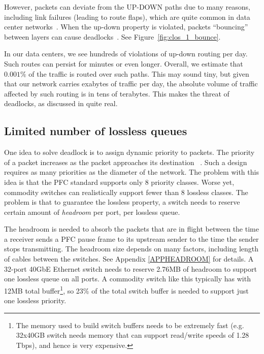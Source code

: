 However, packets can deviate from the UP-DOWN paths due to many reasons,
including link failures (leading to route flaps), which are quite common in data
center networks~\cite{netpilot,f10}. When the up-down property is violated,
packets ``bouncing'' between layers can cause
deadlocks~\cite{shpiner2016unlocking}. See
Figure~\ref{fig:clos_1_bounce}.

In our data centers, we see hundreds of violations of up-down routing per
day. Such routes can persist for minutes or even longer. Overall, we estimate
that $0.001\%$ of the traffic is routed over such paths. This may sound tiny,
but given that our network carries exabytes of traffic per day, the absolute
volume of traffic affected by such routing is in tens of terabytes. This makes
the threat of deadlocks, as discussed
in\cite{rdmaatscale,shpiner2016unlocking,hu2016deadlocks} quite real.

\subsection{Limited number of lossless queues}
\label{subsec:pfcheadroom}

One idea to solve deadlock is to assign dynamic priority to packets. The
priority of a packet increases as the packet approaches its destination
~\cite{karol2003prevention}.  Such a design requires as many priorities as the
diameter of the network.  The problem with this idea is that the PFC standard
supports only 8 priority classes. Worse yet, commodity switches can
realistically support fewer than 8 lossless classes.  The problem is that  to
guarantee the lossless property, a switch needs to reserve certain amount of
{\it headroom} per port, per lossless queue.

The headroom is needed to absorb the packets that are in flight between the time
a receiver sends a PFC pause frame to its upstream sender to the time the sender
stops transmitting.  The headroom size depends on many factors, including length
of cables between the switches. See Appendix \ref{APPHEADROOM} for details.  A
32-port 40GbE Ethernet switch needs to reserve 2.76MB of headroom to support one
lossless queue on all ports. A commodity switch like this typically has with
12MB total buffer\footnote{The memory used to build switch buffers needs to be
extremely fast (e.g. 32x40GB switch needs memory that can support read/write
speeds of 1.28 Tbps), and hence is very expensive.}, so 23\%
of the total switch buffer is needed to support just one lossless priority.

